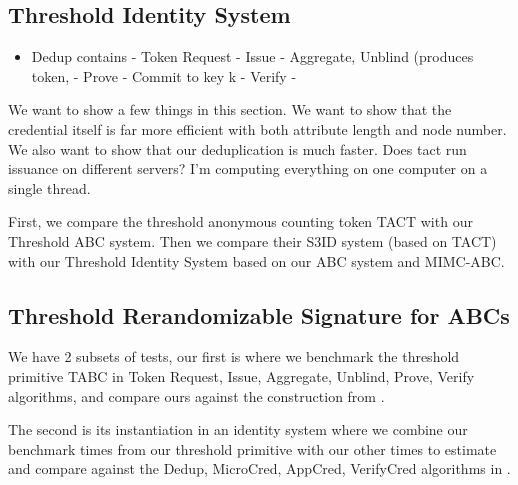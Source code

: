 \subsection{Threshold Identity System}
\begin{itemize}
    \item Dedup contains 
    - Token Request
    - Issue
    - Aggregate, Unblind (produces token, 
    - Prove
    - Commit to key k
    - Verify
    - 
\end{itemize}
























We want to show a few things in this section.
We want to show that the credential itself is far more efficient with both attribute length and node number.
We also want to show that our deduplication is much faster.
Does tact run issuance on different servers? I'm computing everything on one computer on a single thread.




First, we compare the threshold anonymous counting token TACT with our Threshold ABC system. 
Then we compare their S3ID system (based on TACT) with our Threshold Identity System based on our ABC system and MIMC-ABC. 



\subsection{Threshold Rerandomizable Signature for ABCs}




\label{sec:threshold-performance-tact}
We have 2 subsets of tests, our first is where we benchmark the threshold primitive TABC in Token Request, Issue, Aggregate, Unblind, Prove, Verify algorithms, and compare ours against the construction from \cite{rabaninejad_attribute-based_2024}.

The second is its instantiation in an identity system where we combine our benchmark times from our threshold primitive with our other times to estimate and compare against the Dedup, MicroCred, AppCred, VerifyCred algorithms in \cite{rabaninejad_attribute-based_2024}.

